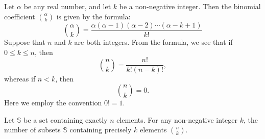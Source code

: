 \documentclass[11pt]{article}
\begin{document}
\begin{definition}
	Let \(\alpha\) be any real number, and let \(k\) be a non-negative integer. Then the binomial coefficient \(\binom{\alpha}{k}\) is given by the formula:
	\[
		\binom{\alpha}{k} = \frac{\alpha(\alpha - 1)(\alpha - 2) \cdots (\alpha - k + 1)}{k!}
	\]
	Suppose that \(n\) and \(k\) are both integers. From the formula, we see that
	if \(0 \leq k \leq n\), then
	\[
		\binom{n}{k} = \frac{n!}{k!(n - k)!},
	\]
	whereas if \(n < k\), then
	\[
		\binom{n}{k} = 0.
	\]
	Here we employ the convention \(0! = 1\).
\end{definition}

\begin{theorem}\label{1.20}
	Let \(\mathbb{S}\) be a set containing exactly \(n\) elements. For any non-negative integer \(k\), the number of subsets \(\mathbb{S}\) containing precisely \(k\) elements \(\binom{n}{k}\).
\end{theorem}
\end{document}
